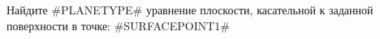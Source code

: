 Найдите #PLANETYPE# уравнение плоскости, касательной к заданной поверхности в точке:
#SURFACEPOINT1#